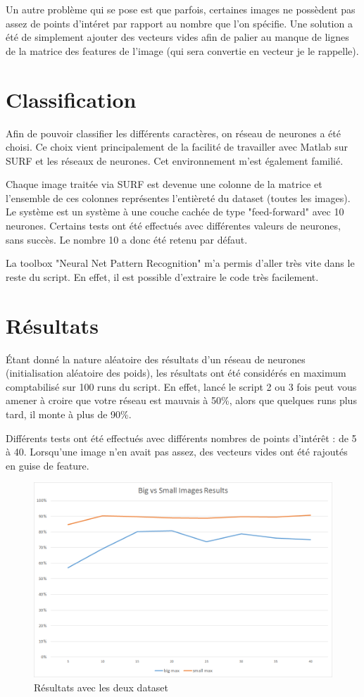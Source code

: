Un autre problème qui se pose est que parfois, certaines images ne possèdent pas assez de points d'intéret par rapport au nombre que l'on spécifie. Une solution a été de simplement ajouter des vecteurs vides afin de palier au manque de lignes de la matrice des features de l'image (qui sera convertie en vecteur je le rappelle).

\section{Classification}

Afin de pouvoir classifier les différents caractères, on réseau de neurones a été choisi. Ce choix vient principalement de la facilité de travailler avec Matlab sur SURF et les réseaux de neurones. Cet environnement m'est également familié.

Chaque image traitée via SURF est devenue une colonne de la matrice et l'ensemble de ces colonnes représentes l'entièreté du dataset (toutes les images). Le système est un système à une couche cachée de type "feed-forward" avec 10 neurones. Certains tests ont été effectués avec différentes valeurs de neurones, sans succès. Le nombre 10 a donc été retenu par défaut.

La toolbox "Neural Net Pattern Recognition" m'a permis d'aller très vite dans le reste du script. En effet, il est possible d'extraire le code très facilement.

\section{Résultats}

Étant donné la nature aléatoire des résultats d'un réseau de neurones (initialisation aléatoire des poids), les résultats ont été considérés en maximum comptabilisé sur 100 runs du script. En effet, lancé le script 2 ou 3 fois peut vous amener à croire que votre réseau est mauvais à 50\%, alors que quelques runs plus tard, il monte à plus de 90\%.

Différents tests ont été effectués avec différents nombres de points d'intérêt : de 5 à 40. Lorsqu'une image n'en avait pas assez, des vecteurs vides ont été rajoutés en guise de feature. 

\begin{figure}[h]
\centering
\includegraphics[width=0.8\linewidth]{pictures/bigvssmallresults.png}
\caption{Résultats avec les deux dataset}
\label{fig:resultdataset}
\end{figure}

